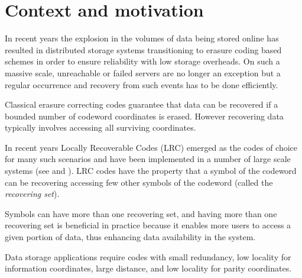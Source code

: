 \chapter{Context and motivation}

In recent years the explosion in the volumes of data being stored online has resulted in distributed storage systems transitioning to erasure coding based schemes in order to ensure reliability with low storage overheads. On such a massive scale, unreachable or failed servers are no longer an exception but a regular occurrence and recovery from such events has to be done efficiently.

Classical erasure correcting codes guarantee that data can be recovered if a bounded number of codeword coordinates is erased. However recovering data typically involves accessing all surviving coordinates. 

In recent years Locally Recoverable Codes (LRC) emerged as the codes of choice for many such scenarios and have been implemented in a number of large scale systems (see \cite{azure} and \cite{hadoop}). LRC codes have the property that a symbol of the codeword can be recovering accessing few other symbols of the codeword (called the \textit{recovering set}).

Symbols can have more than one recovering set, and having more than one recovering set is beneficial in practice because it enables more users to access a given portion of data, thus enhancing data availability in the system.

Data storage applications require codes with small redundancy, low locality for information coordinates, large distance, and low locality for parity coordinates.